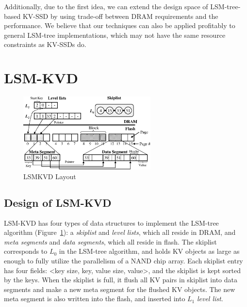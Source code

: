 \documentclass{abstract_hutech}
\newcommand{\ours}{LSM-KVD}
\begin{document}
Additionally, due to the first idea, we can extend the design space of LSM-tree-based KV-SSD by using trade-off between DRAM requirements and the performance.
We believe that our techniques can also be applied profitably to general LSM-tree implementations, which may not have the same resource constraints as KV-SSDs do.

\vspace{-10pt}
\section{\ours{}}\vspace{-20pt}
\begin{figure}[h]
	\centering
	\includegraphics[height=4.0cm]{fig/fig3.eps}
	\caption{LSMKVD Layout}
	\label{fig:overall}\vspace{-20pt}
\end{figure}
\subsection{Design of \ours{}}\vspace{-5pt}
\ours{} has four types of data structures to implement the LSM-tree algorithm
(Figure~\ref{fig:overall}): a \textit{skiplist} and \textit{level lists}, which
all reside in DRAM, and  \textit{meta segments} and \textit{data segments},
which all reside in flash. The skiplist corresponds to $L_0$ in the LSM-tree algorithm, and holds KV
objects as large as enough to fully utilize the parallelism of a NAND chip
array.  Each skiplist entry has four fields: <key size, key, value size,
value>, and the skiplist is kept sorted by the keys. 
When the skiplist is full, it flush all KV pairs in skiplist into data segments and make a new meta segment for the flushed KV objects.
The new meta segment is also written into the flash, and inserted into $L_1$ \textit{level list}.
\end{document}
